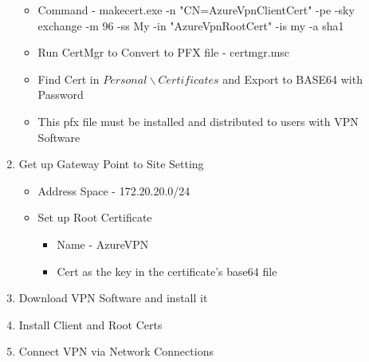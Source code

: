 \documentclass{article}
\begin{document}
\begin{enumerate}
\begin{itemize}
\item Command - makecert.exe -n "CN=AzureVpnClientCert" -pe -sky exchange -m 96 -ss My -in "AzureVpnRootCert" -is my -a sha1
\item Run CertMgr to Convert to PFX file - certmgr.msc
\item Find Cert in $Personal\backslash Certificates$ and Export to BASE64 with Password
\item This pfx file must be installed and distributed to users with VPN Software
\end{itemize}
\item Get up Gateway Point to Site Setting
\begin{itemize}
\item Address Space - 172.20.20.0/24
\item Set up Root Certificate
\begin{itemize}
\item Name - AzureVPN
\item Cert as the key in the certificate's base64 file
\end{itemize}
\end{itemize}
\item Download VPN Software and install it
\item Install Client and Root Certs
\item Connect VPN via Network Connections
\end{enumerate}
\end{document}
